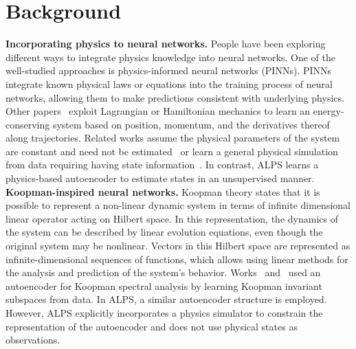 \documentclass[acmtog]{techreportacmart}
\begin{document}
\section{Background} %
\textbf{Incorporating physics to neural networks.}
People have been exploring different ways to integrate physics knowledge into neural networks. One of the well-studied approaches is physics-informed neural networks (PINNs). PINNs integrate known physical laws or equations into the training process of neural networks, allowing them to make predictions consistent with underlying physics. Other papers~\cite{cranmer2020lagrangian} exploit Lagrangian or Hamiltonian mechanics to learn an energy-conserving system based on position, momentum, and the derivatives thereof along trajectories. Related works assume the physical parameters of the system are constant and need not be estimated~\cite{gupta2019general} or learn a general physical simulation from data requiring having state information~\cite{sanchez2020learning}. In contrast, ALPS learns a physics-based autoencoder to estimate states in an unsupervised manner.
\\
\textbf{Koopman-inspired neural networks.} Koopman theory states that it is possible to represent a non-linear dynamic system in terms of infinite dimensional linear operator acting on Hilbert space. In this representation, the dynamics of the system can be described by linear evolution equations, even though the original system may be nonlinear. Vectors in this Hilbert space are represented as infinite-dimensional sequences of functions, which allows using linear methods for the analysis and prediction of the system's behavior. Works~\cite{takeishi2017learning} and~\cite{otto2019linearly} used an autoencoder for Koopman spectral analysis by learning Koopman invariant subspaces from data. In ALPS, a similar autoencoder structure is employed. However, ALPS explicitly incorporates a physics simulator to constrain the representation of the autoencoder and does not use physical states as observations.
\end{document}
